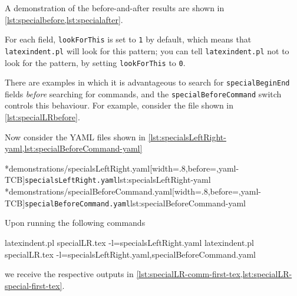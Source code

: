 	A demonstration of the before-and-after results are shown in \cref{lst:specialbefore,lst:specialafter}.

        \begin{cmhtcbraster}
        \end{cmhtcbraster}

	For each field, \texttt{lookForThis} is set to \texttt{1} by default,
	which means that \texttt{latexindent.pl} will look for this pattern; you can tell
	\texttt{latexindent.pl} not to look for the pattern, by setting \texttt{lookForThis}
	to \texttt{0}.

	There are%
	 examples in which it
	is advantageous to search for \texttt{specialBeginEnd} fields \emph{before}
	searching for commands, and the \texttt{specialBeforeCommand} switch controls this behaviour.
	For example, consider the file shown in \cref{lst:specialLRbefore}.


	Now consider the YAML files shown in \cref{lst:specialsLeftRight-yaml,lst:specialBeforeCommand-yaml}

        \begin{cmhtcbraster}
		\cmhlistingsfromfile[]*{demonstrations/specialsLeftRight.yaml}[width=.8\linewidth,before=\centering,yaml-TCB]{\texttt{specialsLeftRight.yaml}}{lst:specialsLeftRight-yaml}
		\cmhlistingsfromfile[]*{demonstrations/specialBeforeCommand.yaml}[width=.8\linewidth,before=\centering,yaml-TCB]{\texttt{specialBeforeCommand.yaml}}{lst:specialBeforeCommand-yaml}
        \end{cmhtcbraster}

	Upon running the following commands
	\begin{widepage}
		\begin{commandshell}
latexindent.pl specialLR.tex -l=specialsLeftRight.yaml      
latexindent.pl specialLR.tex -l=specialsLeftRight.yaml,specialBeforeCommand.yaml      
    \end{commandshell}
	\end{widepage}
	we receive the respective outputs in \cref{lst:specialLR-comm-first-tex,lst:specialLR-special-first-tex}.

	\begin{minipage}{.49\linewidth}
	\end{minipage}
	\hfill
	\begin{minipage}{.49\linewidth}
	\end{minipage}

